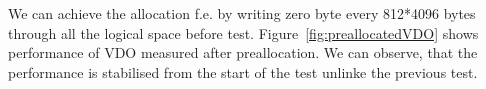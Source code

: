 \documentclass[
  color, %
  table, %
  lof,   %
  lot,   %
]{fithesis3}
\begin{document}
We can achieve the allocation f.e. by writing zero byte every 812*4096 bytes through all the logical space before test. Figure~\ref{fig:preallocatedVDO} shows performance of VDO measured after preallocation. We can observe, that the performance is stabilised from the start of the test unlinke the previous test.





\end{document}
